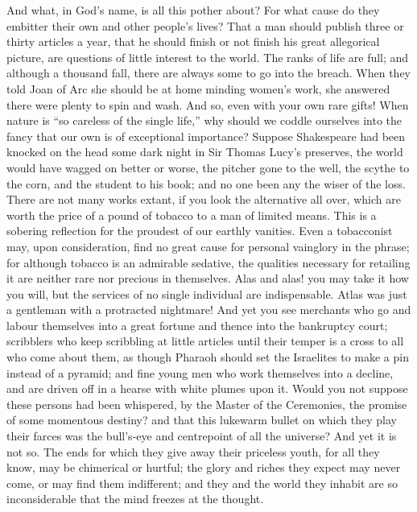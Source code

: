 And what, in God's name, is all this pother about? For what cause do
they embitter their own and other people's lives? That a man should
publish three or thirty articles a year, that he should finish or not
finish his great allegorical picture, are questions of little interest
to the world. The ranks of life are full; and although a thousand
fall, there are always some to go into the breach. When they told Joan
of Arc she should be at home minding women's work, she answered there
were plenty to spin and wash. And so, even with your own rare gifts!
When nature is ``so careless of the single life,'' why should we
coddle ourselves into the fancy that our own is of exceptional
importance? Suppose Shakespeare had been knocked on the head some dark
night in Sir Thomas Lucy's preserves, the world would have wagged on
better or worse, the pitcher  gone to the well, the scythe
to the corn, and the student to his book; and no one been any the
wiser of the loss. There are not many works extant, if you look the
alternative all over, which are worth the price of a pound of tobacco
to a man of limited means. This is a sobering reflection for the
proudest of our earthly vanities. Even a tobacconist may, upon
consideration, find no great cause for personal vainglory in the
phrase; for although tobacco is an admirable sedative, the qualities
necessary for retailing it are neither rare nor precious in
themselves. Alas and alas! you may take it how you will, but the
services of no single individual are indispensable. Atlas was just a
gentleman with a protracted nightmare! And yet you see merchants who
go and labour themselves into a great fortune and thence into the
bankruptcy court; scribblers who keep scribbling at little articles
until their temper is a cross to all who come about them, as though
Pharaoh should set the Israelites to make a pin instead of a pyramid;
and fine  young men who work themselves into a decline, and
are driven off in a hearse with white plumes upon it. Would you not
suppose these persons had been whispered, by the Master of the
Ceremonies, the promise of some momentous destiny? and that this
lukewarm bullet on which they play their farces was the bull's-eye and
centrepoint of all the universe? And yet it is not so. The ends for
which they give away their priceless youth, for all they know, may be
chimerical or hurtful; the glory and riches they expect may never
come, or may find them indifferent; and they and the world they
inhabit are so inconsiderable that the mind freezes at the thought.

